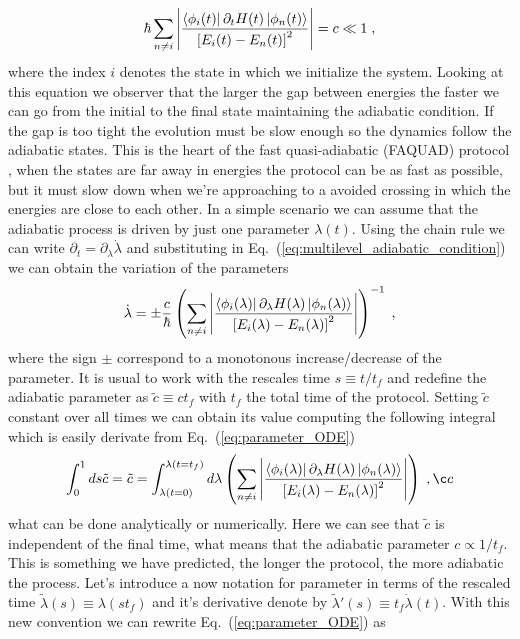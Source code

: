 \begin{equation}
	\hbar\sum_{n\neq i}\abs{\frac{\bra{\phi_i(t)}\partial_t H(t)\ket{\phi_n(t)}}{\left[E_i(t)-E_n(t)\right]^2}}=c\ll 1\; ,
	\label{eq:multilevel_adiabatic_condition}
\end{equation}
where the index $i$ denotes the state in which we initialize the system. Looking at this equation we observer that the larger the gap between energies the faster we can go from the initial to the final state maintaining the adiabatic condition. If the gap is too tight the evolution must be slow enough so the dynamics follow the adiabatic states. This is the heart of the fast quasi-adiabatic (FAQUAD) protocol \cite{MartinezGaraot2015}, when the states are far away in energies the protocol can be as fast as possible, but it must slow down when we're approaching to a avoided crossing in which the energies are close to each other. In a simple scenario we can assume that the adiabatic process is driven by just one parameter $\lambda(t)$. Using the chain rule we can write $\partial_t=\partial_\lambda \dot{\lambda}$ and substituting in Eq.~(\ref{eq:multilevel_adiabatic_condition}) we can obtain the variation of the parameters
\begin{equation}
	\dot{\lambda}=\pm \frac{c}{\hbar}\left(\sum_{n\neq i}\abs{\frac{\bra{\phi_i(\lambda)}\partial_\lambda H(\lambda)\ket{\phi_n(\lambda)}}{\left[E_i(\lambda)-E_n(\lambda)\right]^2}}\right)^{-1}\; ,
	\label{eq:parameter_ODE}
\end{equation}
where the sign $\pm$ correspond to a monotonous increase/decrease of the parameter. It is usual to work with the rescales time $s\equiv t/t_f$ and redefine the adiabatic parameter as $\tilde{c}\equiv ct_f$ with $t_f$ the total time of the protocol. Setting $\tilde{c}$ constant over all times we can obtain its value computing the following integral which is easily derivate from Eq.~(\ref{eq:parameter_ODE})
\begin{equation}
	\int_0^1 ds\tilde{c}=\tilde{c}=\int_{\lambda(t=0)}^{\lambda(t=t_f)}d\lambda \left(\sum_{n\neq i}\abs{\frac{\bra{\phi_i(\lambda)}\partial_\lambda H(\lambda)\ket{\phi_n(\lambda)}}{\left[E_i(\lambda)-E_n(\lambda)\right]^2}}\right)\; ,ç
	\label{eq:c_tilde_deff}
\end{equation}
what can be done analytically or numerically. Here we can see that $\tilde{c}$ is independent of the final time, what means that the adiabatic parameter $c\propto 1/t_f$. This is something we have predicted, the longer the protocol, the more adiabatic the process. Let's introduce a now notation for parameter in terms of the rescaled time $\tilde{\lambda}(s)\equiv \lambda(s t_f)$ and it's derivative denote by $\tilde{\lambda}'(s)\equiv t_f\dot{\lambda}(t)$. With this new convention we can rewrite Eq.~(\ref{eq:parameter_ODE}) as
